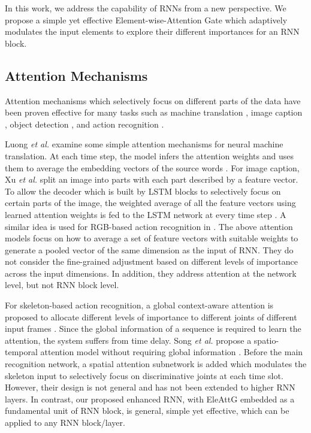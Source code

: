 \documentclass[runningheads]{llncs}
\newcommand{\Outer}{Element-wise}
\begin{document}
{	In this work, we address the capability of RNNs from a new perspective. We propose a simple yet effective \Outer-Attention Gate which adaptively modulates the input elements to explore their different importances for an RNN block. 

	\subsection{Attention Mechanisms}
	Attention mechanisms which selectively focus on different parts of the data have been proven effective for many tasks such as machine translation \cite{luong2015effective,vaswani2017attention}, image caption \cite{xu2015show}, object detection \cite{li2017attentive}, and action recognition \cite{sharma2015actionattention,wang2016hierarchical}. 


	Luong {\it et al.} examine some simple attention mechanisms for neural machine translation. At each time step, the model infers the attention weights and uses them to average the embedding vectors of the source words \cite{luong2015effective}. For image caption, Xu {\it et al.} split an image into  parts with each part described by a feature vector. To allow the decoder which is built by LSTM blocks to selectively focus on certain parts of the image, the weighted average of all the feature vectors using learned attention weights is fed to the LSTM network at every time step \cite{xu2015show}. A similar idea is used for RGB-based action recognition in \cite{sharma2015actionattention}. The above attention models focus on how to  average a set of feature vectors with suitable weights to generate a pooled vector of the same dimension as the input of RNN. They do not consider the fine-grained adjustment based on different levels of importance across the input dimensions. In addition, they address attention at the network level, but not RNN block level.


	For skeleton-based action recognition, a global context-aware attention is proposed to allocate different levels of importance to different joints of different input frames \cite{liu2017global}. Since the global information of a sequence is required to learn the attention, the system suffers from time delay. Song {\it et al.} propose a spatio-temporal attention model without requiring global information \cite{song2017end}. Before the main recognition network, a spatial attention subnetwork is added which modulates the skeleton input to selectively focus on discriminative joints at each time slot. However, their design is not general and has not been extended to higher RNN layers. In contrast, our proposed enhanced RNN, with EleAttG embedded as a fundamental unit of RNN block, is general, simple yet effective, which can be applied to any RNN block/layer. 
	
}
\end{document}
